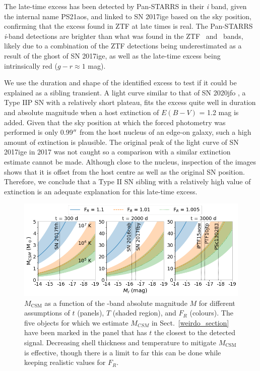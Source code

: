 \documentclass[a4paper,oneside,12pt, class=Latex/Classes/PhDthesisPSnPDF, crop=false]{standalone}
\begin{document}
The late-time excess has been detected by Pan-STARRS in their \textit{i} band, given the internal name PS21aos, and linked to SN 2017ige based on the sky position, confirming that the excess found in ZTF at late times is real. The Pan-STARRS \textit{i}-band detections are brighter than what was found in the ZTF \ztfg~and \ztfr~bands, likely due to a combination of the ZTF detections being underestimated as a result of the ghost of SN 2017ige, as well as the late-time excess being intrinsically red ($g - r \approx 1$ mag). 

We use the duration and shape of the identified excess to test if it could be explained as a sibling transient. A light curve similar to that of SN 2020jfo \citep{Sollerman_2020jfo, IIp_ext}, a Type IIP SN with a relatively short plateau, fits the excess quite well in duration and absolute magnitude when a host extinction of $ E(B - V)$ = 1.2 mag is added. Given that the sky position at which the forced photometry was performed is only 0.99$^{\prime\prime}$ from the host nucleus of an edge-on galaxy, such a high amount of extinction is plausible. The original peak of the light curve of SN 2017ige in 2017 was not caught so a comparison with a similar extinction estimate cannot be made. Although close to the nucleus, inspection of the images shows that it is offset from the host centre as well as the original SN position. Therefore, we conclude that a Type II SN sibling with a relatively high value of extinction is an adequate explanation for this late-time excess.


\begin{figure}
    \centering
    \includegraphics[width=16cm]{../Images/chapter_4/M_MCSM_rel.png}
    \caption{$M_\text{CSM}$ as a function of the \ztfr-band absolute magnitude $M$ for different assumptions of $t$ (panels), $T$ (shaded region), and $F_R$ (colours). The five objects for which we estimate $M_{CSM}$ in Sect.~\ref{weirdo_section} have been marked in the panel that has $t$ the closest to the detected signal. Decreasing shell thickness and temperature to mitigate $M_\text{CSM}$ is effective, though there is a limit to far this can be done while keeping realistic values for $F_R$.}
    \label{M_CMS_fig}
\end{figure}
\end{document}
